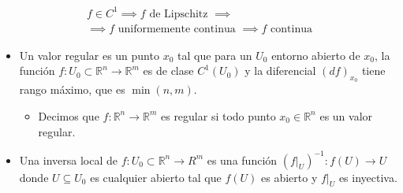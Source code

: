 \documentclass[a4paper,twocolumn]{extarticle}
\newcommand{\R}{\mathbb{R}}
\begin{document}
\begin{multline}
\boxed{
	\begin{array}{c}
	f \in C^1 \implies f \text{ de Lipschitz }\implies\\
	\implies f \text{ uniformemente continua }\implies f\text{ continua}
	\end{array}
	}
\end{multline}

\begin{itemize}
	\item Un valor regular es un punto $x_0$ tal que para un $U_0$ entorno abierto de $x_0$, la función $f:U_0 \subset \R^n \to \R^m$ es de clase $C^1(U_0)$ y la diferencial $(df)_{x_0}$ tiene rango máximo, que es $\min(n, m)$.
	\begin{itemize}
		\item Decimos que $f:\R^n \to \R^m$ es regular si todo punto $x_0 \in \R^n$ es un valor regular.
	\end{itemize}
	\item Una inversa local de $f:U_0 \subset \R^n \to R^m$ es una función $(f|_U)^{-1} : f(U) \to U$ donde $U \subseteq U_0$ es cualquier abierto tal que $f(U)$ es abierto y $f|_U$ es inyectiva.

\end{itemize}
\end{document}
